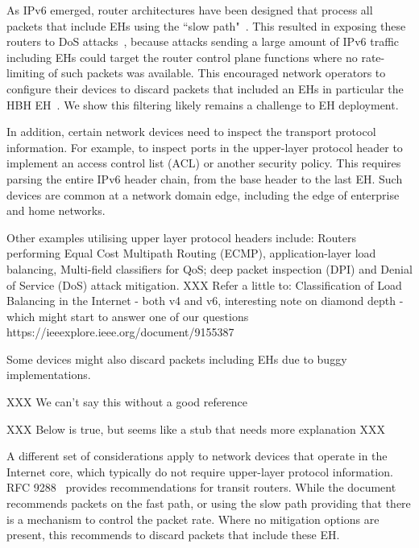 \documentclass[conference]{IEEEtran}
\begin{document}

As IPv6 emerged, router architectures have been designed that process all packets that include EHs using the ``slow path"~\cite{ietf-v6ops-hbh-03}.  This resulted in exposing these routers to DoS attacks~\cite{naagas2021deh}, because attacks sending a large amount of IPv6 traffic including EHs could target the router control plane functions where no rate-limiting of such packets was available. This encouraged
network operators to configure their devices to discard packets that included an EHs
in particular the HBH EH~\cite{ietf-v6ops-hbh-03}. We show this filtering likely remains a challenge to EH deployment.

In addition, certain network devices need to inspect the transport protocol information. For example, to inspect ports in the upper-layer protocol header to implement an access control list (ACL) or another security policy.
This requires parsing the entire IPv6 header chain, from the base header to the last EH. 
Such devices are common at a network domain edge, including the edge of enterprise and home networks.

Other examples utilising upper layer protocol headers include: Routers performing Equal Cost Multipath Routing (ECMP), application-layer load balancing, Multi-field classifiers for QoS; deep packet inspection (DPI) and Denial of Service (DoS) attack mitigation. 
XXX
Refer a little to:
Classification of Load Balancing in the Internet - both v4 and v6, interesting note on diamond depth - which might start to answer one of our questions
https://ieeexplore.ieee.org/document/9155387

Some devices might also discard packets including EHs due to buggy implementations.

XXX We can't say this without a good reference

XXX Below is true, but seems like a stub that needs more explanation XXX

A different set of considerations apply to network devices that operate in the Internet core, which typically do not require upper-layer protocol information.
RFC 9288~\cite{rfc9288}  provides recommendations for transit routers. While the document recommends packets on the fast path, or using the slow path providing that there  is a mechanism to control the  packet rate. Where no mitigation options are present, this recommends to discard packets that include these EH. 
\end{document}
